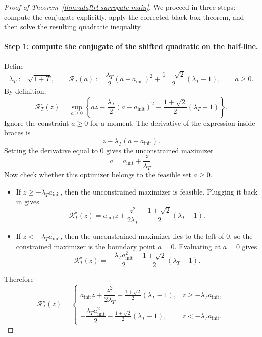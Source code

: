\documentclass[11pt]{article}
\newcommand{\1}{\mathbf{1}}
\begin{document}
\begin{proof}[Proof of Theorem~\ref{thm:adaftrl-surrogate-main}]
We proceed in three steps: compute the conjugate explicitly, apply the corrected black-box theorem, and then solve the resulting quadratic inequality.

\paragraph{Step 1: compute the conjugate of the shifted quadratic on the half-line.}
Define
\[
\lambda_T:=\sqrt{1+T},
\qquad
\mathcal R_T(a) := \frac{\lambda_T}{2}(a-a_{\mathrm{init}})^2 + \frac{1+\sqrt{2}}{2}(\lambda_T-1),
\qquad a\ge 0.
\]
By definition,
\[
\mathcal R_T^\star(z)=\sup_{a\ge 0}\left\{az-\frac{\lambda_T}{2}(a-a_{\mathrm{init}})^2-\frac{1+\sqrt{2}}{2}(\lambda_T-1)\right\}.
\]
Ignore the constraint $a\ge 0$ for a moment. The derivative of the expression inside braces is
\[
z-\lambda_T(a-a_{\mathrm{init}}).
\]
Setting the derivative equal to $0$ gives the unconstrained maximizer
\[
a=a_{\mathrm{init}}+\frac{z}{\lambda_T}.
\]
Now check whether this optimizer belongs to the feasible set $a\ge 0$.
\begin{itemize}[leftmargin=*]
\item If $z\ge -\lambda_T a_{\mathrm{init}}$, then the unconstrained maximizer is feasible. Plugging it back in gives
\[
\mathcal R_T^\star(z)=a_{\mathrm{init}}z+\frac{z^2}{2\lambda_T}-\frac{1+\sqrt{2}}{2}(\lambda_T-1).
\]
\item If $z< -\lambda_T a_{\mathrm{init}}$, then the unconstrained maximizer lies to the left of $0$, so the constrained maximizer is the boundary point $a=0$. Evaluating at $a=0$ gives
\[
\mathcal R_T^\star(z)=-\frac{\lambda_T a_{\mathrm{init}}^2}{2}-\frac{1+\sqrt{2}}{2}(\lambda_T-1).
\]
\end{itemize}
Therefore
\[
\mathcal R_T^\star(z)
=
\begin{cases}
a_{\mathrm{init}}z+\dfrac{z^2}{2\lambda_T}-\frac{1+\sqrt{2}}{2}(\lambda_T-1), & z\ge -\lambda_T a_{\mathrm{init}},\\[2ex]
-\dfrac{\lambda_T a_{\mathrm{init}}^2}{2}-\frac{1+\sqrt{2}}{2}(\lambda_T-1), & z< -\lambda_T a_{\mathrm{init}}.
\end{cases}
\]


\end{proof}
\end{document}
